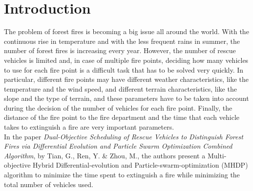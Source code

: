 \section{Introduction}
The problem of forest fires is becoming a big issue all around the world. With the continuous rise in temperature and with the less frequent rains in summer, the number of forest fires is increasing every year. However, the number of rescue vehicles is limited and, in case of multiple fire points, deciding how many vehicles to use for each fire point is a difficult task that has to be solved very quickly. In particular, different fire points may have different weather characteristics, like the temperature and the wind speed, and different terrain characteristics, like the slope and the type of terrain, and these parameters have to be taken into account during the decision of the number of vehicles for each fire point. Finally, the distance of the fire point to the fire department and the time that each vehicle takes to extinguish a fire are very important parameters.\\
In the paper \textit{Dual-Objective Scheduling of Rescue Vehicles to Distinguish Forest Fires via Differential Evolution and Particle Swarm Optimization Combined Algorithm}\cite{fire_distinguish}, by Tian, G., Ren, Y. \& Zhou, M., the authors present a  Multi-objective Hybrid Differential-evolution and Particle-swarm-optimization (MHDP) algorithm to minimize the time spent to extinguish a fire while minimizing the total number of vehicles used.
